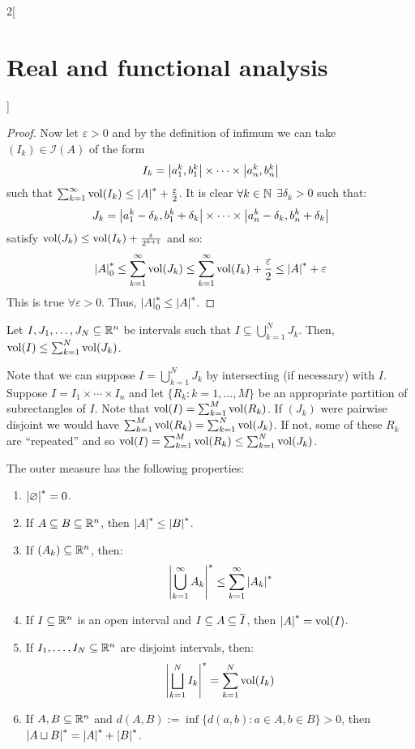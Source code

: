 \documentclass[../../../main_math.tex]{subfiles}
\begin{document}
\begin{multicols}{2}[\section{Real and functional analysis}]
\begin{proof}
    Now let $\varepsilon>0$ and by the definition of infimum we can take $(I_k)\in\mathcal{I}(A)$ of the form $$I_k=\abs{a_1^k,b_1^k}\times\cdots\times\abs{a_n^k,b_n^k}$$ such that $\sum_{k=1}^\infty\vol(I_k)\leq \om{A}+\frac{\varepsilon}{2}$.
    It is clear $\forall k\in\mathbb{N}$ $\exists\delta_k>0$ such that:
    $$J_k=\abs{a_1^k-\delta_k,b_1^k+\delta_k}\times\cdots\times\abs{a_n^k-\delta_k,b_n^k+\delta_k}$$
    satisfy $\operatorname{vol}(J_k)\leq\operatorname{vol}(I_k) +\frac{\varepsilon}{2^{k+1}}$ and so:
    $$\om{A}_0\leq \sum_{k=1}^\infty\vol(J_k)\leq\sum_{k=1}^\infty\vol(I_k) +\frac{\varepsilon}{2}\leq\om{A}+\varepsilon$$
    This is true $\forall \varepsilon>0$. Thus, $\om{A}_0\leq\om{A}$.
  \end{proof}
  \begin{lemma}
    Let $I,J_1,\ldots,J_N\subseteq \mathbb{R}^n$ be intervals such that $I\subseteq \bigcup_{k=1}^N J_k$. Then, $\operatorname{vol}(I)\leq\sum_{k=1}^N \operatorname{vol}(J_k)$.
  \end{lemma}
  \begin{sproof}
    Note that we can suppose $I=\bigcup_{k=1}^N J_k$ by intersecting (if necessary) with $I$. Suppose $I=I_1\times\cdots\times I_n$ and let $\{R_k:k=1,\ldots,M\}$ be an appropriate partition of subrectangles of $I$. Note that $\operatorname{vol}(I)=\sum_{k=1}^M\operatorname{vol}(R_k)$. If $(J_k)$ were pairwise disjoint we would have $\sum_{k=1}^M\operatorname{vol}(R_k)=\sum_{k=1}^{N}\operatorname{vol}(J_k)$. If not, some of these $R_k$ are ``repeated'' and so $\operatorname{vol}(I)=\sum_{k=1}^M\operatorname{vol}(R_k)\leq\sum_{k=1}^{N}\operatorname{vol}(J_k)$.
  \end{sproof}
  \begin{theorem}
    The outer measure has the following properties:
    \begin{enumerate}
      \item $\om{\varnothing}=0$.
            \item\label{RFA:measureB} If $A\subseteq B\subseteq\mathbb{R}^n$, then $\om{A}\leq \om{B}$.
      \item \label{RFA:measureC} If $(A_k)\subseteq \mathbb{R}^n$, then: $$\om{\bigcup_{k=1}^\infty A_k}\leq \sum_{k=1}^\infty \om{A_k}$$
      \item \label{RFA:measureD}If $I\subseteq \mathbb{R}^n$ is an open interval and $I\subseteq A\subseteq \overline{I}$, then $\om{A}=\vol(I)$.
            \item\label{RFA:measureE} If $I_1,\ldots,I_N\subseteq \mathbb{R}^n$ are disjoint intervals, then: $$\displaystyle \om{\bigsqcup_{k=1}^N I_k}= \sum_{k=1}^N \vol(I_k)$$
      \item If $A,B\subseteq \mathbb{R}^n$ and $d(A,B):=\inf\{d(a,b):a\in A,b\in B\}>0$, then $\om{A\sqcup B}=\om{A}+\om{B}$.

\end{enumerate}
\end{theorem}
\end{multicols}
\end{document}
